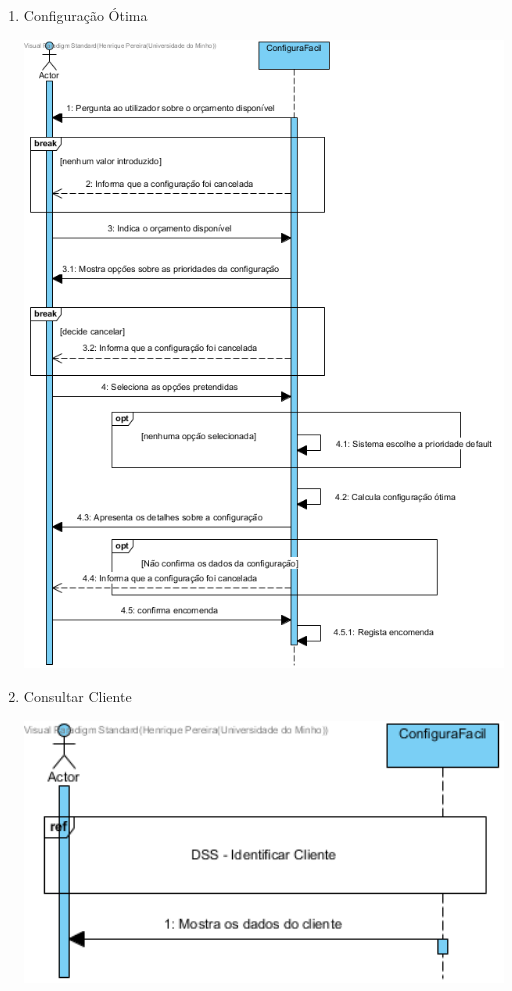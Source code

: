 \documentclass[11pt]{article} %
\begin{document}
\begin{enumerate}
	\item Configuração Ótima
		\begin{center}
 			\includegraphics[width = 6in]{dss_configuracao_otima.png}
		\end{center}
	\item Consultar Cliente
		\begin{center}
 			\includegraphics[width = 6in]{dss_consultar_cliente.png}

\end{center}
\end{enumerate}
\end{document}
